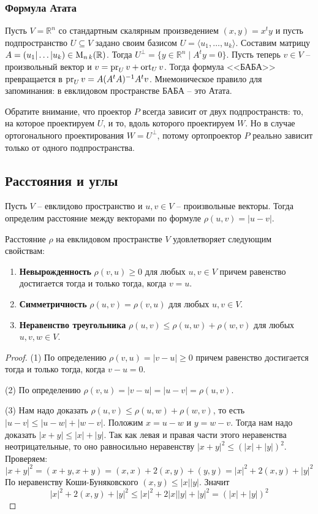 \subsubsection*{Формула Атата}

Пусть $V = \mathbb R^n$ со стандартным скалярным произведением $(x, y) = x^ty$ и пусть подпространство $U\subseteq V$ задано своим базисом $U = \langle u_1,\ldots,u_k\rangle$. Составим матрицу $A = (u_1|\ldots|u_k)\in\operatorname{M}_{n\,k}(\mathbb R)$. Тогда $U^\bot = \{y\in \mathbb R^n \mid A^t y = 0\}$. Пусть теперь $v\in V$ -- произвольный вектор и $v = \operatorname{pr}_U v + \operatorname{ort}_U v$. Тогда формула <<БАБА>> превращается в $\operatorname{pr}_U v = A(A^tA)^{-1}A^tv$. Мнемоническое правило для запоминания: в евклидовом пространстве БАБА -- это Атата.

Обратите внимание, что проектор $P$ всегда зависит от двух подпространств: то, на которое проектируем $U$, и то, вдоль которого проектируем $W$. Но в случае ортогонального проектирования $W = U^\bot$, потому ортопроектор $P$ реально зависит только от одного подпространства.

\subsection{Расстояния и углы}

\begin{definition}
Пусть $V$ -- евклидово пространство и $u,v\in V$ -- произвольные векторы. Тогда определим расстояние между векторами по формуле $\rho(u,v) = |u - v|$.
\end{definition}

\begin{claim}
Расстояние $\rho$ на евклидовом пространстве $V$ удовлетворяет следующим свойствам:
\begin{enumerate}
\item {\bf Невырожденность} $\rho(v,u) \geqslant 0$ для любых $u,v\in V$ причем равенство достигается тогда и только тогда, когда $v = u$.
\item {\bf Симметричность} $\rho(u,v) = \rho(v,u)$ для любых $u,v\in V$.
\item {\bf Неравенство треугольника} $\rho(u,v)\leqslant \rho(u,w) + \rho(w,v)$ для любых $u,v,w\in V$.
\end{enumerate}
\end{claim}
\begin{proof}
(1) По определению $\rho(v,u) = |v-u| \geqslant 0$ причем равенство достигается тогда и только тогда, когда $v - u = 0$.

(2) По определению $\rho(v, u) = |v - u| = |u-v| = \rho(u,v)$.

(3) Нам надо доказать $\rho(u,v)\leqslant \rho(u,w) + \rho(w,v)$, то есть $|u-v|\leqslant |u-w| + |w - v|$. Положим $x = u - w$ и $y = w - v$. Тогда нам надо доказать $|x + y|\leqslant |x| + |y|$. Так как левая и правая части этого неравенства неотрицательные, то оно равносильно неравенству $|x+y|^2\leqslant (|x| + |y|)^2$. Проверяем:
\[
|x+y|^2 = (x+y, x+y) = (x, x) + 2(x, y) + (y,y) = |x|^2 + 2 (x, y) + |y|^2
\]
По неравенству Коши-Буняковского $(x, y)\leqslant |x| |y|$. Значит
\[
|x|^2 + 2 (x, y) + |y|^2\leqslant |x|^2 + 2|x||y| + |y|^2= (|x|+|y|)^2
\]
\end{proof}

